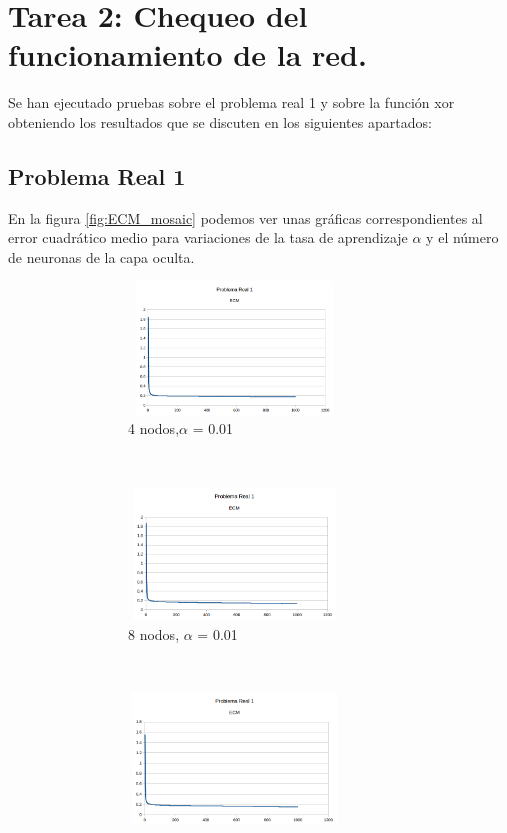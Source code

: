 \documentclass[spanish]{assignment}
\begin{document}
	\section{Tarea 2: Chequeo del funcionamiento de la red.}
	Se han ejecutado pruebas sobre el problema real 1 y sobre la función xor obteniendo los resultados que se discuten en los siguientes apartados:
	
	\subsection{Problema Real 1}
	En la figura \ref{fig:ECM_mosaic} podemos ver unas gráficas correspondientes al error cuadrático medio para variaciones de la tasa de aprendizaje $\alpha$ y el número de neuronas de la capa oculta.
	
	\begin{figure}[ht!]
		\begin{subfigure}[t!]{0.5\textwidth}
			\begin{subfigure}[t!]{\textwidth}
				\centering
				\includegraphics[width=160pt, height=100pt]{PR1h1.png}
				\caption{4 nodos,$\alpha$ = 0.01}
			\end{subfigure}\\
			\begin{subfigure}[t!]{\textwidth}
				\centering
				\includegraphics[width=160pt, height=100pt]{PR1h2.png}
				\caption{8 nodos, $\alpha$ = 0.01}
			\end{subfigure}\\
			\begin{subfigure}[t!]{\textwidth}
				\centering
				\includegraphics[width=160pt, height=100pt]{PR1h3.png}

\end{subfigure}
\end{subfigure}
\end{figure}
\end{document}
